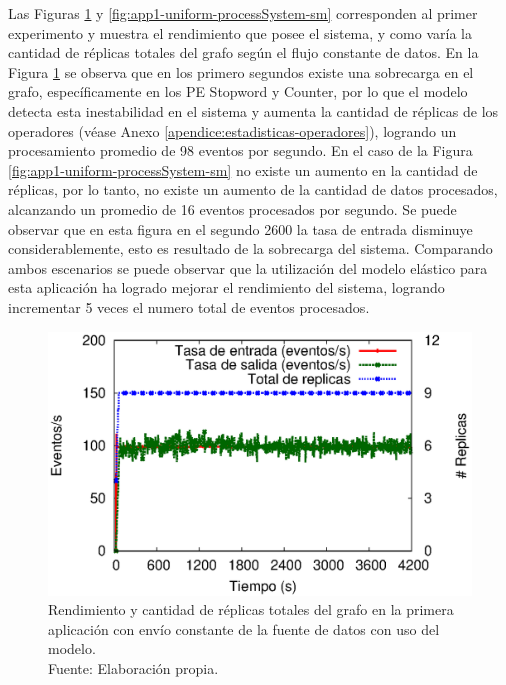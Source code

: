 
Las Figuras \ref{fig:app1-uniform-processSystem-cm} y \ref{fig:app1-uniform-processSystem-sm} \normalsize{corresponden al primer experimento y muestra el rendimiento que posee el sistema, y como var\'ia la cantidad de r\'eplicas totales del grafo seg\'un el flujo constante de datos.} En la Figura \ref{fig:app1-uniform-processSystem-cm} \normalsize{se observa que en los primero segundos existe una sobrecarga en el grafo, espec\'ificamente en los PE Stopword y Counter, por lo que el modelo detecta esta inestabilidad en el sistema y aumenta la cantidad de r\'eplicas de los operadores} (v\'ease Anexo \ref{apendice:estadisticas-operadores}), \normalsize{logrando un procesamiento promedio de  98 eventos por segundo.} En el caso de la Figura \ref{fig:app1-uniform-processSystem-sm} \normalsize{no existe un aumento en la cantidad de r\'eplicas, por lo tanto, no existe un aumento de la cantidad de datos procesados, alcanzando un promedio de 16 eventos procesados por segundo. Se puede observar que en esta figura en el segundo 2600 la tasa de entrada disminuye considerablemente, esto es resultado de la sobrecarga del sistema. Comparando ambos escenarios se puede observar que la utilizaci\'on del modelo el\'astico para esta aplicaci\'on ha logrado mejorar el rendimiento del sistema, logrando incrementar 5 veces el numero total de eventos procesados.}

\begin{figure}[!ht]
	\centering
	\captionsetup{justification=centering}
	\includegraphics[scale=0.65]{images/exp/app1/uniform/cm/processSystem.eps}
    \caption[Rendimiento y cantidad de r\'eplicas totales del grafo en la primera aplicaci\'on con env\'io constante de la fuente de datos con uso del modelo.]{Rendimiento y cantidad de r\'eplicas totales del grafo en la primera aplicaci\'on con env\'io constante de la fuente de datos con uso del modelo.\\Fuente: Elaboraci\'on propia.}
	\label{fig:app1-uniform-processSystem-cm}
\end{figure}

